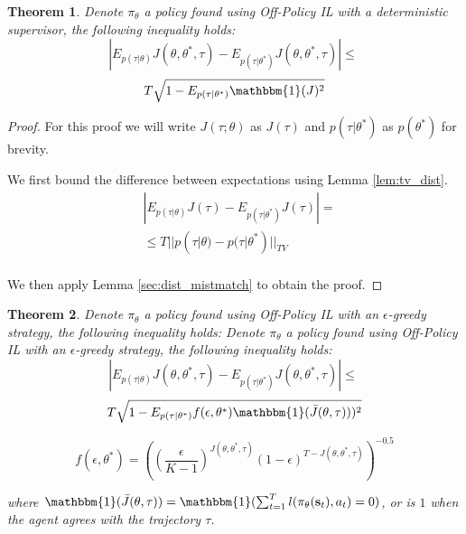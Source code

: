 \documentclass[conference]{article}
\newcommand{\bs}{\mathbf{s}}
\newtheorem{theorem}{Theorem}[section]
\newtheorem{proof}[theorem]{proof}
\begin{document}
\begin{theorem}
Denote $\pi_{\theta}$ a policy found using Off-Policy IL with a deterministic supervisor, the following inequality holds:
$$ |E_{p(\tau|\theta)} J(\theta,\theta^*,\tau)  - E_{p(\tau|\theta^*)} J(\theta,\theta^*,\tau) | \leq \: $$
$$ T\sqrt{1 - E_{p(\tau|\theta^*)} \mathbbm{1}(J)^2} $$
\end{theorem}

\begin{proof}
For this proof we will write  $J(\tau;\theta)$ as $J(\tau)$ and $p(\tau|\theta^*)$ as $p(\theta^*)$ for brevity. 

We first bound the difference between expectations using Lemma \ref{lem:tv_dist}. 
\begin{align}
&|E_{p(\tau|\theta)} J(\tau) - E_{p(\tau|\theta^*)} J(\tau)| =\\
&\leq T||p(\tau|\theta) - p(\tau|\theta^*)||_{TV}\\ 
 \end{align}

We then apply Lemma \ref{sec:dist_mistmatch} to obtain the proof.  
 
\end{proof}

\begin{theorem}
Denote $\pi_{\theta}$ a policy found using Off-Policy IL with an $\epsilon$-greedy strategy, the following inequality holds:
Denote $\pi_{\theta}$ a policy found using Off-Policy IL with an $\epsilon$-greedy strategy, the following inequality holds:
$$ |E_{p(\tau|\theta)} J(\theta,\theta^*,\tau)  - E_{p(\tau|\theta^*)} J(\theta,\theta^*,\tau) | \leq \: $$
$$ T\sqrt{1 - E_{p(\tau|\theta^*)}f(\epsilon,\theta^*)\mathbbm{1}(\bar{J}(\theta,\tau)))^2} $$

$$f(\epsilon,\theta^*) = ((\frac{\epsilon}{K-1})^{J(\theta,\theta^*,\tau)}(1-\epsilon)^{T-J(\theta,\theta^*,\tau)})^{-0.5}$$

where $\mathbbm{1}(\bar{J}(\theta,\tau)) =  \mathbbm{1}(\sum^T_{t=1} l(\pi_{\theta}(\bs_{t}),a_t)=0)$, or is $1$ when the agent agrees with the trajectory $\tau$. 
\end{theorem}
\end{document}
